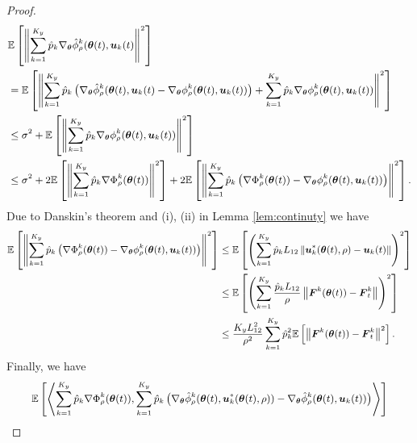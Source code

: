 \begin{proof}
	\begin{equation}
		\label{eq:theta gap 1}
		\small
		\begin{aligned}
			& \mE\left[\left\|\sum\limits_{k = 1}^{K_{y}}\hat{p}_{k}\nabla_{\btheta}\hat{\phi}_{\rho}^{k}(\btheta(t), \bu_{k}(t)\right\|^{2}\right] \\
			& = \mE\left[\left\|\sum\limits_{k = 1}^{K_{y}}\hat{p}_{k}\left(\nabla_{\btheta}\hat{\phi}_{\rho}^{k}(\btheta(t), \bu_{k}(t) - \nabla_{\btheta}\phi_{\rho}^{k}(\btheta(t), \bu_{k}(t))\right) + \sum\limits_{k = 1}^{K_{y}}\hat{p}_{k}\nabla_{\btheta}\phi_{\rho}^{k}(\btheta(t), \bu_{k}(t))\right\|^{2}\right] \\
			& \leq \sigma^{2} + \mE\left[\left\|\sum\limits_{k = 1}^{K_{y}}\hat{p}_{k}\nabla_{\btheta}\phi_{\rho}^{k}(\btheta(t), \bu_{k}(t))\right\|^{2}\right] \\
			& \leq \sigma^{2} + 2\mE\left[\left\|\sum\limits_{k = 1}^{K_{y}}\hat{p}_{k}\nabla\Phi_{\rho}^{k}(\btheta(t))\right\|^{2}\right] +  2\mE\left[\left\|\sum\limits_{k=1}^{K_{y}}\hat{p}_{k}\left(\nabla\Phi_{\rho}^{k}(\btheta(t)) - \nabla_{\btheta}\phi_{\rho}^{k}(\btheta(t), \bu_{k}(t))\right)\right\|^{2}\right]. 
		\end{aligned}
	\end{equation}
	Due to Danskin's theorem and (i), (ii) in Lemma \ref{lem:continuty} we have  
	\begin{equation}
		\label{eq:theta gap 2}
		\small
		\begin{aligned}
			\mE\left[\left\|\sum\limits_{k=1}^{K_{y}}\hat{p}_{k}\left(\nabla\Phi_{\rho}^{k}(\btheta(t)) - \nabla_{\btheta}\phi_{\rho}^{k}(\btheta(t), \bu_{k}(t))\right)\right\|^{2}\right] & \leq \mE\left[\left(\sum\limits_{k=1}^{K_{y}}\hat{p}_{k}L_{12}\left\|\bu^{*}_{k}(\btheta(t), \rho) - \bu_{k}(t)\right\|\right)^{2}\right] \\
			& \leq \mE\left[\left(\sum\limits_{k=1}^{K_{y}}\frac{\hat{p}_{k}L_{12}}{\rho}\left\|\bF^{k}(\btheta(t)) - \bF_{t}^{k}\right\|\right)^{2}\right] \\
			& \leq \frac{K_{y}L_{12}^{2}}{\rho^{2}}\sum\limits_{k=1}^{K_{y}}\hat{p}_{k}^{2}\mE\left[\left\|\bF^{k}(\btheta(t)) - \bF_{t}^{k}\right\|^{2}\right]. 
		\end{aligned}
	\end{equation}
	Finally, we have 
	\begin{equation}
		\small
		\begin{aligned}
			& \mE\left[\left\langle\sum\limits_{k=1}^{K_{y}}\hat{p}_{k}\nabla\Phi_{\rho}^{k}(\btheta(t)), \sum\limits_{k=1}^{K_{y}}\hat{p}_{k}\left(\nabla_{\btheta}\hat{\phi}_{\rho}^{k}(\btheta(t), \bu_{k}^{*}(\btheta(t), \rho)) - \nabla_{\btheta}\hat{\phi}_{\rho}^{k}(\btheta(t), \bu_{k}(t))\right)\right\rangle\right] \\

\end{aligned}
\end{equation}
\end{proof}
